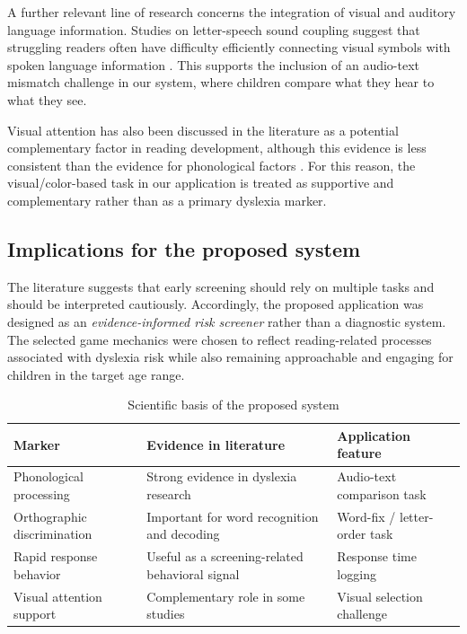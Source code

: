 \documentclass[conference]{IEEEtran}
\begin{document}
A further relevant line of research concerns the integration of visual and auditory language information. Studies on letter-speech sound coupling suggest that struggling readers often have difficulty efficiently connecting visual symbols with spoken language information \cite{blau2010}. This supports the inclusion of an audio-text mismatch challenge in our system, where children compare what they hear to what they see.

Visual attention has also been discussed in the literature as a potential complementary factor in reading development, although this evidence is less consistent than the evidence for phonological factors \cite{vidyasagar2010}. For this reason, the visual/color-based task in our application is treated as supportive and complementary rather than as a primary dyslexia marker.

\subsection{Implications for the proposed system}

The literature suggests that early screening should rely on multiple tasks and should be interpreted cautiously. Accordingly, the proposed application was designed as an \textit{evidence-informed risk screener} rather than a diagnostic system. The selected game mechanics were chosen to reflect reading-related processes associated with dyslexia risk while also remaining approachable and engaging for children in the target age range.

\begin{table}[htbp]
\caption{Scientific basis of the proposed system}
\label{tab:literature_mapping}
\centering
\begin{tabular}{|p{2.0cm}|p{2.3cm}|p{2.7cm}|}
\hline
\textbf{Marker} & \textbf{Evidence in literature} & \textbf{Application feature} \\
\hline
Phonological processing & Strong evidence in dyslexia research & Audio-text comparison task \\
\hline
Orthographic discrimination & Important for word recognition and decoding & Word-fix / letter-order task \\
\hline
Rapid response behavior & Useful as a screening-related behavioral signal & Response time logging \\
\hline
Visual attention support & Complementary role in some studies & Visual selection challenge \\
\hline
\end{tabular}
\end{table}
\end{document}
